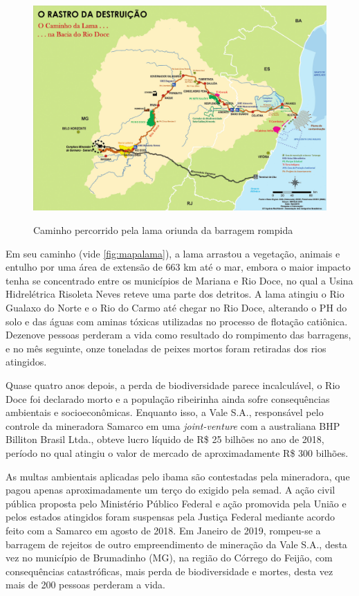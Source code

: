 \documentclass[
article,			%
11pt,				%
oneside,			%
a4paper,			%
english,			%
brazil,				%
sumario=tradicional
]{abntex2}
\begin{document}
	\begin{figure}[htb]
		\centering
		\caption{Caminho percorrido pela lama oriunda da barragem rompida}
		\includegraphics[width=1.0\linewidth]{img/pinto_005_01.png}
		\label{fig:mapalama}
	\end{figure}
	 
	Em seu caminho (vide \autoref{fig:mapalama}), a lama arrastou a vegetação, animais e entulho por uma área de extensão de 663 km até o mar, embora o maior impacto tenha se concentrado entre os municípios de Mariana e Rio Doce, no qual a Usina Hidrelétrica Risoleta Neves reteve uma parte dos detritos. A lama atingiu o Rio Gualaxo do Norte e o Rio do Carmo até chegar no Rio Doce, alterando o PH do solo e das águas com aminas tóxicas utilizadas no processo de flotação catiônica. Dezenove pessoas perderam a vida como resultado do rompimento das barragens, e no mês seguinte, onze toneladas de peixes mortos foram retiradas dos rios atingidos. 
	 
	Quase quatro anos depois, a perda de biodiversidade parece incalculável, o Rio Doce foi declarado morto e a população ribeirinha ainda sofre consequências ambientais e socioeconômicas. Enquanto isso, a Vale S.A., responsável pelo controle da mineradora Samarco em uma \textit{joint-venture} com a australiana BHP Billiton Brasil Ltda., obteve lucro líquido de R\$ 25 bilhões no ano de 2018, período no qual atingiu o valor de mercado de aproximadamente R\$ 300 bilhões. 
	 
	As multas ambientais aplicadas pelo \gls{ibama} são contestadas pela mineradora, que pagou apenas aproximadamente um terço  do exigido pela \glsdesc{semad}. A ação civil pública proposta pelo Ministério Público Federal e ação promovida pela União e pelos estados atingidos foram suspensas pela Justiça Federal mediante acordo feito com a Samarco em agosto de 2018. Em Janeiro de 2019, rompeu-se  a barragem de rejeitos de outro empreendimento de mineração da Vale S.A., desta vez no município de Brumadinho (MG), na região do Córrego do Feijão, com consequências catastróficas, mais perda de biodiversidade e mortes, desta vez mais de 200 pessoas perderam a vida.
	 
\end{document}

